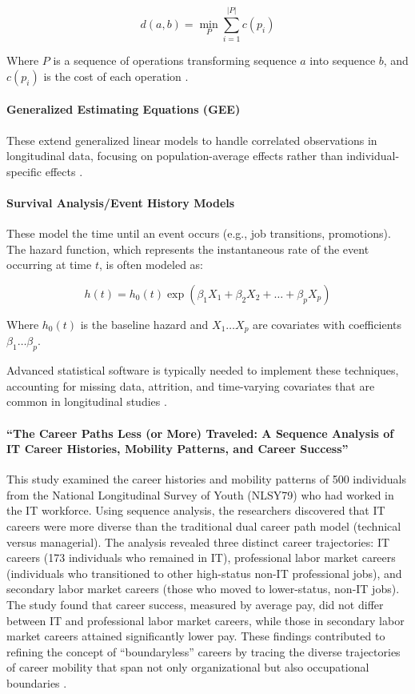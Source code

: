\documentclass[../main.tex]{subfiles}
\begin{document}
\[ d(a,b) = \min_P \sum_{i=1}^{|P|} c(p_i) \]

Where \(P\) is a sequence of operations transforming sequence \(a\) into sequence \(b\), and \(c(p_i)\) is the cost of each operation \citep{joseph2012career}.

\paragraph{Generalized Estimating Equations (GEE)}
These extend generalized linear models to handle correlated observations in longitudinal data, focusing on population-average effects rather than individual-specific effects \citep{statsmodels2024}.

\paragraph{Survival Analysis/Event History Models}
These model the time until an event occurs (e.g., job transitions, promotions). The hazard function, which represents the instantaneous rate of the event occurring at time \(t\), is often modeled as:

\[ h(t) = h_0(t) \exp(\beta_1 X_1 + \beta_2 X_2 + \ldots + \beta_p X_p) \]

Where \(h_0(t)\) is the baseline hazard and \(X_1 \ldots X_p\) are covariates with coefficients \(\beta_1 \ldots \beta_p\).

Advanced statistical software is typically needed to implement these techniques, accounting for missing data, attrition, and time-varying covariates that are common in longitudinal studies \citep{lme4slides2011, statsmodels2024}.


\paragraph{``The Career Paths Less (or More) Traveled: A Sequence Analysis of IT Career Histories, Mobility Patterns, and Career Success''}
This study examined the career histories and mobility patterns of 500 individuals from the National Longitudinal Survey of Youth (NLSY79) who had worked in the IT workforce. Using sequence analysis, the researchers discovered that IT careers were more diverse than the traditional dual career path model (technical versus managerial). The analysis revealed three distinct career trajectories: IT careers (173 individuals who remained in IT), professional labor market careers (individuals who transitioned to other high-status non-IT professional jobs), and secondary labor market careers (those who moved to lower-status, non-IT jobs). The study found that career success, measured by average pay, did not differ between IT and professional labor market careers, while those in secondary labor market careers attained significantly lower pay. These findings contributed to refining the concept of ``boundaryless'' careers by tracing the diverse trajectories of career mobility that span not only organizational but also occupational boundaries \citep{joseph2012career}.
\end{document}

